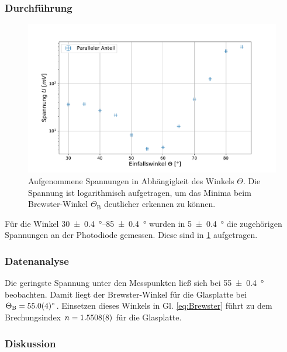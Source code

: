 	\subsubsection*{Durchführung}
		
		\begin{figure}[ht]
			\centering
			\includegraphics[width=\textwidth]{data/Spiegel.pdf}
			\caption{Aufgenommene Spannungen in Abhängigkeit des Winkels $\Theta$. Die Spannung ist logarithmisch aufgetragen, um das Minima beim Brewster-Winkel $\Theta_\text{B}$ deutlicher erkennen zu können.}
			\label{fig:GlasplatteWinkel}	
		\end{figure}
		Für die Winkel \SIrange{30+-0,4}{85+-0,4}{\degree} wurden in \SI{5+-0,4}{\degree} die zugehörigen Spannungen an der Photodiode gemessen.
		Diese sind in \ref{fig:GlasplatteWinkel} aufgetragen.
	
	\subsubsection*{Datenanalyse}
		
		Die geringste Spannung unter den Messpunkten ließ sich bei \SI{55+-0,4}{\degree} beobachten.
		Damit liegt der Brewster-Winkel für die Glasplatte bei $\Theta_\text{B} =  \SI{55+-0,4}{\degree}$.
		Einsetzen dieses Winkels in Gl. \ref{eq:Brewster} führt zu dem Brechungsindex $n = \SI{1,5508+-0,0008}{}$ für die Glasplatte.
	
	\subsubsection*{Diskussion}
		
